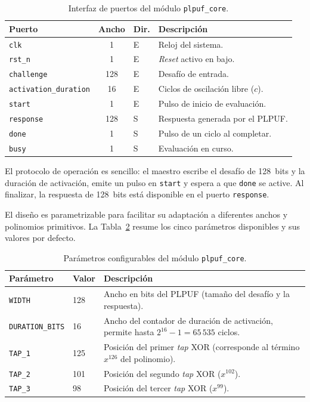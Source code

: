 \begin{table}[htbp]
\centering
\caption{Interfaz de puertos del módulo \texttt{plpuf\_core}.}
\label{tab:plpuf_ports}
\begin{tabular}{lclp{7cm}}
\hline
\textbf{Puerto} & \textbf{Ancho} & \textbf{Dir.} & \textbf{Descripción} \\
\hline
\texttt{clk}                  & 1   & E & Reloj del sistema. \\
\texttt{rst\_n}               & 1   & E & \textit{Reset} activo en bajo. \\
\texttt{challenge}            & 128 & E & Desafío de entrada. \\
\texttt{activation\_duration} & 16  & E & Ciclos de oscilación libre ($c$). \\
\texttt{start}                & 1   & E & Pulso de inicio de evaluación. \\
\texttt{response}             & 128 & S & Respuesta generada por el PLPUF. \\
\texttt{done}                 & 1   & S & Pulso de un ciclo al completar. \\
\texttt{busy}                 & 1   & S & Evaluación en curso. \\
\hline
\end{tabular}
\end{table}

El protocolo de operación es sencillo: el maestro escribe el desafío de
128~bits y la duración de activación, emite un pulso en \texttt{start} y
espera a que \texttt{done} se active. Al finalizar, la respuesta de
128~bits está disponible en el puerto \texttt{response}.

El diseño es parametrizable para facilitar su adaptación a diferentes anchos
y polinomios primitivos. La Tabla~\ref{tab:params} resume los cinco
parámetros disponibles y sus valores por defecto.

\begin{table}[htbp]
\centering
\caption{Parámetros configurables del módulo \texttt{plpuf\_core}.}
\label{tab:params}
\begin{tabular}{llp{7cm}}
\hline
\textbf{Parámetro} & \textbf{Valor} & \textbf{Descripción} \\
\hline
\texttt{WIDTH}          & 128 & Ancho en bits del PLPUF (tamaño del desafío y la respuesta). \\
\texttt{DURATION\_BITS} & 16  & Ancho del contador de duración de activación, permite hasta $2^{16}-1 = 65\,535$ ciclos. \\
\texttt{TAP\_1}         & 125 & Posición del primer \textit{tap} XOR (corresponde al término $x^{126}$ del polinomio). \\
\texttt{TAP\_2}         & 101 & Posición del segundo \textit{tap} XOR ($x^{102}$). \\
\texttt{TAP\_3}         & 98  & Posición del tercer \textit{tap} XOR ($x^{99}$). \\
\hline
\end{tabular}
\end{table}


